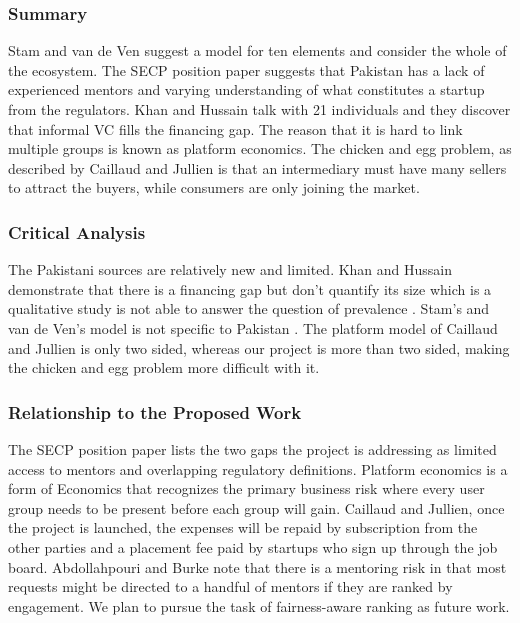 \documentclass{FastFyp}
\begin{document}
\subsubsection{Summary}
Stam and van de Ven \cite{ref:stam2021} suggest a model for ten elements and consider the whole of the ecosystem. The SECP position paper \cite{ref:secpposition} suggests that Pakistan has a lack of experienced mentors and varying understanding of what constitutes a startup from the regulators. Khan and Hussain \cite{ref:khan2026informal} talk with 21 individuals and they discover that informal VC fills the financing gap. The reason that it is hard to link multiple groups is known as platform economics. The chicken and egg problem, as described by Caillaud and Jullien \cite{ref:caillaud2003} is that an intermediary must have many sellers to attract the buyers, while consumers are only joining the market.

\subsubsection{Critical Analysis}
The Pakistani sources are relatively new and limited. Khan and Hussain demonstrate that there is a financing gap but don't quantify its size which is a qualitative study is not able to answer the question of prevalence \cite{ref:khan2026informal}. Stam's and van de Ven's model is not specific to Pakistan \cite{ref:stam2021}. The platform model of Caillaud and Jullien is only two sided, whereas our project is more than two sided, making the chicken and egg problem more difficult with it.

\subsubsection{Relationship to the Proposed Work}
The SECP position paper lists the two gaps the project is addressing as limited access to mentors and overlapping regulatory definitions. Platform economics is a form of Economics that recognizes the primary business risk where every user group needs to be present before each group will gain. Caillaud and Jullien, once the project is launched, the expenses will be repaid by subscription from the other parties and a placement fee paid by startups who sign up through the job board. Abdollahpouri and Burke note that there is a mentoring risk in that most requests might be directed to a handful of mentors if they are ranked by engagement. We plan to pursue the task of fairness-aware ranking as future work.
\end{document}
